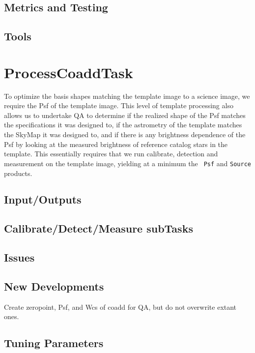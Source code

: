 \documentclass[12pt]{article}
\begin{document}
\subsection{Metrics and Testing}

\subsection{Tools}


\clearpage 
\section{ProcessCoaddTask} 

To optimize the basis shapes matching the template image to a science
image, we require the Psf of the template image.  This level of
template processing also allows us to undertake QA to determine if the
realized shape of the Psf matches the specifications it was designed
to, if the astrometry of the template matches the SkyMap it was
designed to, and if there is any brightness dependence of the Psf by
looking at the measured brightness of reference catalog stars in the
template.  This essentially requires that we run calibrate, detection
and measurement on the template image, yielding at a minimum the {\tt
  Psf} and {\tt Source} products.

\subsection{Input/Outputs}

\subsection{Calibrate/Detect/Measure subTasks}

\subsection{Issues}

\subsection{New Developments}
Create zeropoint, Psf, and Wcs of coadd for QA, but do not overwrite
extant ones.

\subsection{Tuning Parameters}
\end{document}
